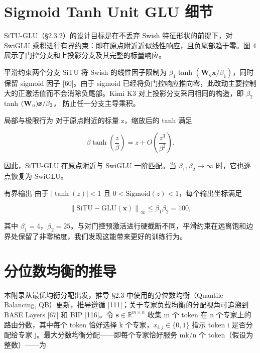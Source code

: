 \section{Sigmoid Tanh Unit GLU 细节}\label{b-details-of-sigmoid-tanh-unit-glu}

SiTU-GLU（§2.3.2）的设计目标是在不丢弃 Swish 特征形状的前提下，对 SwiGLU 乘积进行有界约束：即在原点附近近似线性响应，且负尾部趋于零。图 4 展示了门控分支和上投影分支及其完整的标量响应。

平滑约束两个分支 SiTU 将 Swish 的线性因子限制为 \(\beta _ { 1 }\) tanh
\(( \mathbf { W } _ { g } \pmb { x } / \beta _ { 1 } )\)，同时保留 sigmoid 因子 {[}60{]}。由于 sigmoid 已经将负门控响应推向零，此改动主要控制大的正激活值而不会消除负尾部。Kimi K3 对上投影分支采用相同的构造，即 \(\beta _ { 2 }\) tanh
\({ { \left( { \bf { W } } _ { u } \right)} { \pmb x } / \beta _ { 2 }  }\)，
防止任一分支主导乘积。

局部与极限行为 对于原点附近的标量 z，缩放后的 tanh 满足

\[
\beta \tanh \left(\frac {z}{\beta}\right) = z + O \left(\frac {z ^ {3}}{\beta^ {2}}\right).\tag{18}
\]

因此，SiTU-GLU 在原点附近与 SwiGLU 一阶匹配。当 \(\beta _ { 1 } , \beta _ { 2 } \to \infty\) 时，它也逐点恢复为 SwiGLU。

有界输出 由于 \(| \operatorname { t a n h } ( z ) | < 1\) 且 \(0 < \mathrm { S i g m o i d } ( z ) < 1\)，每个输出坐标满足

\[
\left\| \mathrm{SiTU-GLU} (\boldsymbol {x}) \right\| _ {\infty} \leq \beta_ {1} \beta_ {2} = 1 0 0,\tag{19}
\]

其中 \(\beta _ { 1 } = 4\)，\(\beta _ { 2 } = 2 5\)。与对门控预激活进行硬截断不同，平滑约束在远离饱和边界处保留了非零梯度，我们发现这能带来更好的训练行为。

\section{分位数均衡的推导}\label{c-derivation-of-quantile-balancing}

本附录从最优均衡分配出发，推导 §2.3 中使用的分位数均衡（Quantile Balancing, QB）更新，推导遵循 {[}111{]}；关于专家负载均衡的分配视角可追溯到 BASE Layers {[}67{]} 和 BIP {[}116{]}。令 \(\pmb { s } \in \mathbb { R } ^ { m \times n }\) 收集 m 个 token 在 n 个专家上的路由分数，其中每个 token 恰好选择 k 个专家，\(x _ { i , j } \in \{ 0 , 1 \}\) 指示 token i 是否分配给专家 j。最大分数均衡分配——即每个专家恰好服务 mk/n 个 token（假设为整数）——为

